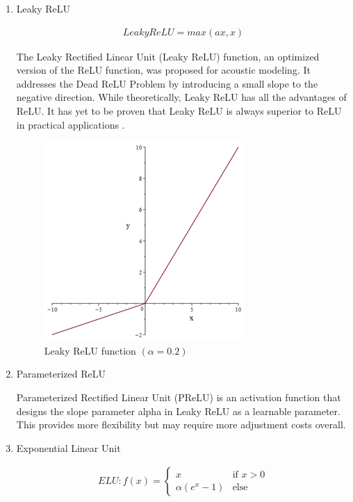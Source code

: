 \documentclass[10pt,journal,compsoc]{IEEEtran}
\begin{document}
\begin{enumerate}
    \item Leaky ReLU

\begin{equation}
    \begin{aligned}
        Leaky ReLU = max(ax, x)
    \end{aligned}
\end{equation}

The Leaky Rectified Linear Unit (Leaky ReLU) function, an optimized version of the ReLU function, was proposed for acoustic modeling. It addresses the Dead ReLU Problem by introducing a small slope to the negative direction. While theoretically, Leaky ReLU has all the advantages of ReLU. It has yet to be proven that Leaky ReLU is always superior to ReLU in practical applications \cite{12}.

\begin{figure}
    \centering
    \includegraphics[scale=0.6] {PNG/2-6.png}
    \caption{Leaky ReLU function $(\alpha = 0.2)$}
    \label{fig:2-6}
\end{figure}

    \item Parameterized ReLU

Parameterized Rectified Linear Unit (PReLU) is an activation function that designs the slope parameter alpha in Leaky ReLU as a learnable parameter. This provides more flexibility but may require more adjustment costs overall.

    \item Exponential Linear Unit

\begin{equation}
    \begin{aligned}
        ELU: f(x) = 
        \begin{cases}
            x & \text{if } x > 0 \\
            \alpha (e^x - 1) & \text{else}
        \end{cases}
    \end{aligned}
\end{equation}


\end{enumerate}
\end{document}
